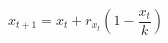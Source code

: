 \documentclass[12pt]{article}
\begin{document}
\begin{equation}
  x_{t+1} = x_{t}+r_{x_{t}}(1 - \frac{x_{t}}{k})
\end{equation}
\end{document}
